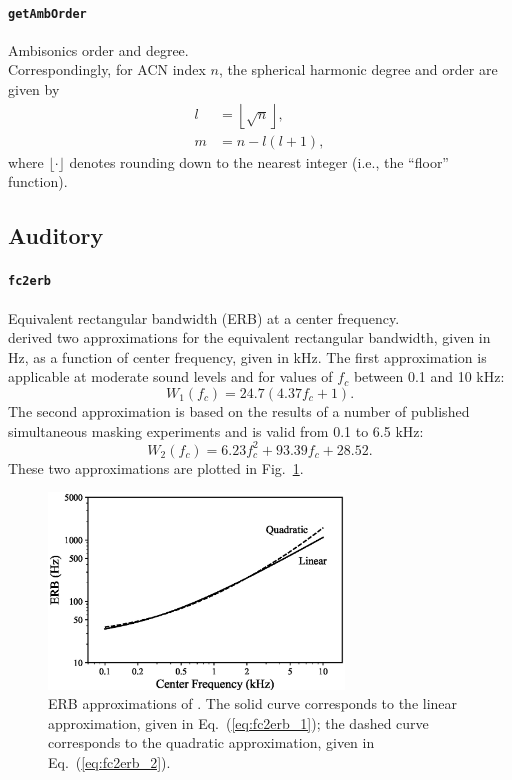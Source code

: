 \documentclass[11pt, oneside]{article}
\newcommand{\figref}[1]{Fig.~\ref{#1}}
\newcommand{\eqnref}[1]{Eq.~(\ref{#1})}
\newcommand{\function}[1]{\paragraph*{\texttt{#1}}}
\begin{document}
\function{getAmbOrder} Ambisonics order and degree. \\
Correspondingly, for ACN index $n$, the spherical harmonic degree and order are given by
\begin{equation}\label{eq:getAmbOrder}
\begin{aligned}
l &= \left\lfloor \sqrt{n} \right\rfloor,\\
m &= n - l (l + 1),
\end{aligned}
\end{equation}
where $\lfloor \cdot \rfloor$ denotes rounding down to the nearest integer (i.e., the ``floor'' function).

\subsection{Auditory}

\function{fc2erb} Equivalent rectangular bandwidth (ERB) at a center frequency. \\
\citet{GlasbergMoore1990} derived two approximations for the equivalent rectangular bandwidth, given in Hz, as a function of center frequency, given in kHz.
The first approximation is applicable at moderate sound levels and for values of $f_c$ between 0.1 and 10 kHz:
\begin{equation}\label{eq:fc2erb_1}
W_1(f_c) = 24.7(4.37 f_c + 1).
\end{equation}
The second approximation is based on the results of a number of published simultaneous masking experiments and is valid from 0.1 to 6.5 kHz:
\begin{equation}\label{eq:fc2erb_2}
W_2(f_c) = 6.23 f_c^2 + 93.39 f_c + 28.52.
\end{equation}
These two approximations are plotted in \figref{fig:fc2erb}.

\begin{figure}[tb]
    	\centering
    	\includegraphics[width=0.7\textwidth]{figures/fc2erb.eps}
    	\caption{ERB approximations of \citet[Fig.~7]{GlasbergMoore1990}.
	The solid curve corresponds to the linear approximation, given in \eqnref{eq:fc2erb_1};
	the dashed curve corresponds to the quadratic approximation, given in \eqnref{eq:fc2erb_2}.}
	\label{fig:fc2erb}
\end{figure}
\end{document}
